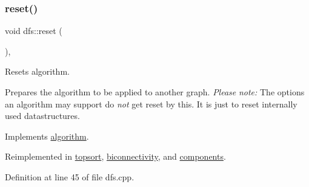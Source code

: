 \subsubsection{\texorpdfstring{reset()}{reset()}}
{\footnotesize\ttfamily void dfs\+::reset (\begin{DoxyParamCaption}{ }\end{DoxyParamCaption})\hspace{0.3cm}{\ttfamily [virtual]}, {\ttfamily [inherited]}}



Resets algorithm. 

Prepares the algorithm to be applied to another graph. {\itshape Please} {\itshape note\+:} The options an algorithm may support do {\itshape not} get reset by this. It is just to reset internally used datastructures. 

Implements \mbox{\hyperlink{classalgorithm_a21aba63d066ae7897de6ca7d8425c408}{algorithm}}.



Reimplemented in \mbox{\hyperlink{classtopsort_aa3d9ccc7c632dac6b7303e9828c14f62}{topsort}}, \mbox{\hyperlink{classbiconnectivity_a4393dd1e626887472f6967722349abc6}{biconnectivity}}, and \mbox{\hyperlink{classcomponents_a07b6bab5962524ae26ccb478b35cd76c}{components}}.



Definition at line 45 of file dfs.\+cpp.


